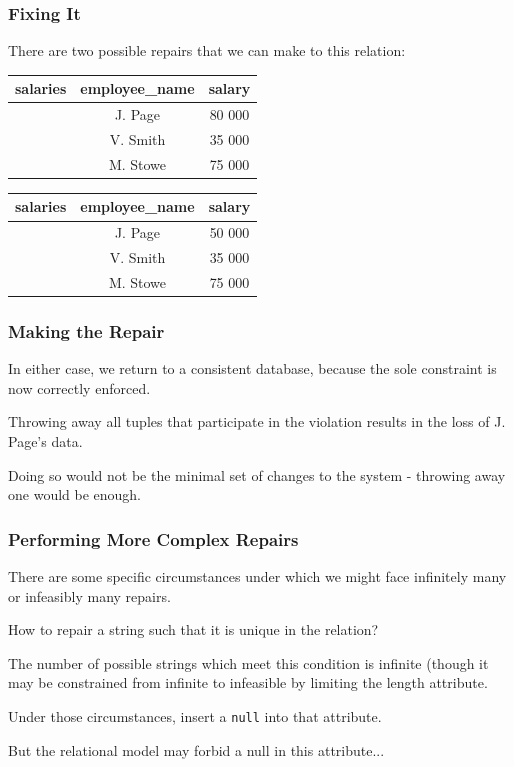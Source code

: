 \begin{frame}
\frametitle{Fixing It}

There are two possible repairs that we can make to this relation:

\begin{table}[h]\begin{center}
        \begin{tabular}{r | c  c} 
					salaries & employee\_name & salary \\ \hline
	         		 & J. Page  & 80 000 \\ 
					 & V. Smith & 35 000 \\ 
					 & M. Stowe & 75 000 \\ 
        \end{tabular}
\end{center}\end{table}

\begin{table}[h]\begin{center}
        \begin{tabular}{r | c  c} 
					salaries & employee\_name & salary \\ \hline
	           		 & J. Page  & 50 000 \\ 
					 & V. Smith & 35 000 \\ 
					 & M. Stowe & 75 000 \\ 
        \end{tabular}
\end{center}\end{table}

\end{frame}


\begin{frame}
\frametitle{Making the Repair}

In either case, we return to a consistent database, because the sole constraint is now correctly enforced.

Throwing away all tuples that participate in the violation results in the loss of J. Page's data. 

Doing so would not be the minimal set of changes to the system - throwing away one would be enough.

\end{frame}


\begin{frame}
\frametitle{Performing More Complex Repairs}

There are some specific circumstances under which we might face infinitely many or infeasibly many repairs. 

How to repair a string such that it is unique in the relation? 

The number of possible strings which meet this condition is infinite (though it may be constrained from infinite to infeasible by limiting the length attribute. 

Under those circumstances, insert a \texttt{null} into that attribute.

But the relational model may forbid a null in this attribute...


\end{frame}


